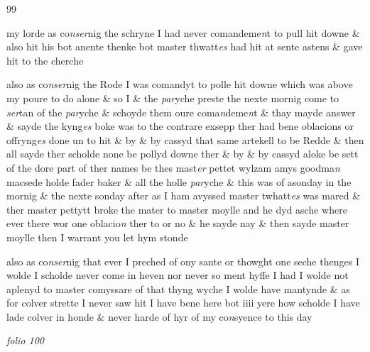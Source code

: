 \documentclass[12pt, a4paper]{book}
\begin{document}
            		\begin{flushright}{\color{Mahogany}99}\end{flushright}
            		
		\ifthenelse{\isodd{\thepage}}
		{\reversemarginpar}
		{\normalmarginpar}
		my lorde as co\textit{nser}nig the schryne I had never comandeme\textit{n}t
 to pull hit downe \& also hit his bot anente thenke
 bot master thwatt\textit{es} had hit at sente astens \& gave
 hit to the cherche
            		
		\ifthenelse{\isodd{\thepage}}
		{\reversemarginpar}
		{\normalmarginpar}
		also as co\textit{nser}nig the Rode I was comandyt to polle hit
 downe which was above my poure to do alone \& so I
 \& the \textit{par}yche preste the nexte mornig come to \textit{ser}tan
 of the \textit{par}yche \& schoyde them oure coma\textit{n}deme\textit{n}t \& thay
 mayde answer \& sayde the kyng\textit{es} boke was to the
 contrare exsepp ther had bene oblacions or offryng\textit{es}
 done un to hit \& by \& by cassyd that same artekell
 to be Redde \& then all sayde ther scholde none be
 pollyd downe ther \& by \& by cassyd aloke be sett
 of the dore part of ther names be thes mast\textit{er}
            			pettet wylzam amys goodma\textit{n} macsede holde fader
 baker \& all the holle \textit{par}yche \& this was of asonday
 in the mornig \& the nexte sonday after as I ham
 avyssed master twhatt\textit{es} was mared \& ther  master
			 pettytt
            			broke the mater to master moylle and he dyd
 asche where ever there wor one oblacio\textit{n} ther
            			to or no \& he sayde nay \& then sayde master
 moylle then I warrant you let hym stonde
            		
		\ifthenelse{\isodd{\thepage}}
		{\reversemarginpar}
		{\normalmarginpar}
		also as co\textit{nser}nig that ever I preched of ony sante
 or thowght one seche thenges I wolde I scholde
 never come in heven nor never so ment hyffe I
 had I wolde not aplenyd to master comyssare of
 that thyng wyche I wolde have mantynde \& as
 for colver strette I never saw hit I have bene here
 bot iiii yere how scholde I have lade colver in honde
 \& never harde of hyr of my co\textit{n}syence to this day

\dotfill
						\newpage
{}

\textit{folio 100}


         \vspace*{4cm}
         
\end{document}

